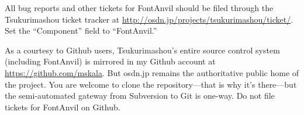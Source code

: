 All bug reports and other tickets for FontAnvil should be filed through
the Tsukurimashou ticket tracker at
\url{http://osdn.jp/projects/tsukurimashou/ticket/}.  Set the
``Component'' field to ``FontAnvil.''

As a courtesy to Github users, Tsukurimashou's entire source control system
(including FontAnvil) is mirrored in my Github account at
\url{https://github.com/mskala}.  But osdn.jp remains the
authoritative public home of the project.  You are welcome to clone the
repository---that is why it's there---but the semi-automated gateway from
Subversion to Git is one-way.  Do not file tickets for FontAnvil on Github.

\clearpage
